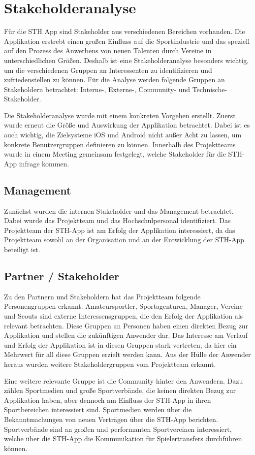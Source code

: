 \chapter{Stakeholderanalyse}
Für die STH App sind Stakeholder aus verschiedenen Bereichen vorhanden. Die Applikation erstrebt einen großen Einfluss auf die Sportindustrie und das speziell auf den Prozess des Anwerbens von neuen Talenten durch Vereine in unterschiedlichen Größen. Deshalb ist eine Stakeholderanalyse besonders wichtig, um die verschiedenen Gruppen an Interessenten zu identifizieren und zufriedenstellen zu können. Für die Analyse werden folgende Gruppen an Stakeholdern betrachtet: Interne-, Externe-, Community- und Technische-Stakeholder. 

\noindent
Die Stakeholderanalyse wurde mit einem konkreten Vorgehen erstellt. Zuerst wurde erneut die Größe und Auswirkung der Applikation betrachtet.
Dabei ist es auch wichtig, die Zielsysteme iOS und Android nicht außer Acht zu lassen, um konkrete Benutzergruppen definieren zu können. Innerhalb des Projektteams wurde in einem Meeting gemeinsam festgelegt, welche Stakeholder für die STH-App infrage kommen.

\section{Management}
Zunächst wurden die internen Stakeholder und das Management betrachtet.
Dabei wurde das Projektteam und das Hochschulpersonal identifiziert. Das Projektteam der STH-App ist am Erfolg der Applikation interessiert, da das Projektteam sowohl an der Organisation und an der Entwicklung der STH-App beteiligt ist.

\section{Partner / Stakeholder}
Zu den Partnern und Stakeholdern hat das Projektteam folgende Personengruppen erkannt. Amateursportler, Sportagenturen, Manager, Vereine und Scouts sind externe Interessensgruppen, die den Erfolg der Applikation als relevant betrachten. Diese Gruppen an Personen haben einen direkten Bezug zur Applikation und stellen die zukünftigen Anwender dar. Das Interesse am Verlauf und Erfolg der Applikation ist in diesen Gruppen stark vertreten, da hier ein Mehrwert für all diese Gruppen erzielt werden kann. Aus der Hülle der Anwender heraus wurden weitere Stakeholdergruppen vom Projektteam erkannt.

\noindent
Eine weitere relevante Gruppe ist die Community hinter den Anwendern. Dazu zählen Sportmedien und große Sportverbände, die keinen direkten Bezug zur Applikation haben, aber dennoch am Einfluss der STH-App in ihren Sportbereichen interessiert sind. Sportmedien werden über die Bekanntmachungen von neuen Verträgen über die STH-App berichten. Sportverbände sind an großen und performanten Sportvereinen interessiert, welche über die STH-App die Kommunikation für Spielertransfers durchführen können.

